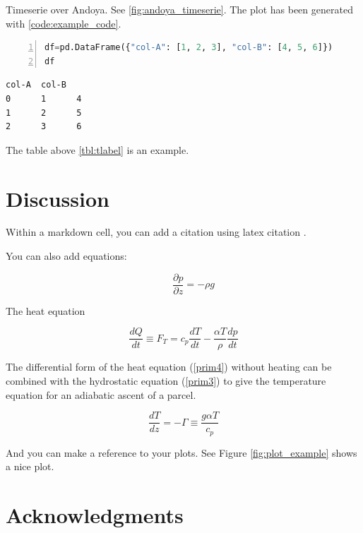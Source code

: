 \documentclass[10pt,parskip=half,
	toc=sectionentrywithdots,
	bibliography=totocnumbered,
	captions=tableheading,numbers=noendperiod]{scrartcl}
\begin{document}
Timeserie over Andoya. See \ref{fig:andoya_timeserie}. The plot has been
generated with \ref{code:example_code}.

\begin{lstlisting}[language=Python,numbers=left,xleftmargin=20pt,xrightmargin=5pt,belowskip=5pt,aboveskip=5pt]
df=pd.DataFrame({"col-A": [1, 2, 3], "col-B": [4, 5, 6]})
df
\end{lstlisting}

\begin{lstlisting}[language={},postbreak={},numbers=none,xrightmargin=7pt,breakindent=0pt,aboveskip=5pt,belowskip=5pt]
   col-A  col-B
0      1      4
1      2      5
2      3      6
\end{lstlisting}

The table above \ref{tbl:tlabel} is an example.

\section{Discussion}\label{discussion}

Within a markdown cell, you can add a citation using latex citation
\cite{allan:2000}.

You can also add equations:

\begin{equation}
    \qquad
    \frac{\partial p}{\partial z}=-\rho g\label{prim3}\end{equation}

The heat equation

\begin{equation}
    \frac{dQ}{dt}\equiv F_{T}=c_{p}\frac{dT}{dt}-\frac{\alpha T}{\rho}\frac{dp}{dt}\label{prim4}
    \end{equation}

The differential form of the heat equation (\ref{prim4}) without heating
can be combined with the hydrostatic equation (\ref{prim3}) to give the
temperature equation for an adiabatic ascent of a parcel.

\begin{equation}
    \frac{dT}{dz}=-\Gamma\equiv\frac{g\alpha T}{c_{p}}\end{equation}

And you can make a reference to your plots. See Figure
\ref{fig:plot_example} shows a nice plot.

\section{Acknowledgments}\label{acknowledgments}
\end{document}
